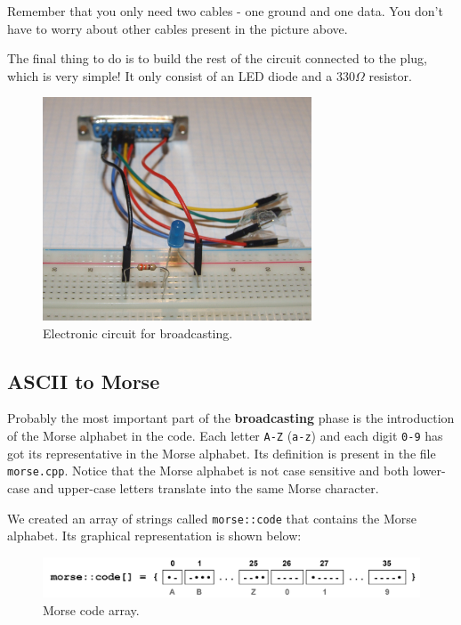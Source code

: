 \documentclass[12pt]{report}
\begin{document}
Remember that you only need two cables - one ground and one data. You don't have to worry about other cables present in the picture above.

The final thing to do is to build the rest of the circuit connected to the plug, which is very simple! It only consist of an LED diode and a 330$\Omega$ resistor.

\begin{figure}[H]
\centering\includegraphics[width=8cm]{broadcast_circuit}
\caption{Electronic circuit for broadcasting.}				
\label{fig:broadcast_circuit}
\end{figure}




\subsection{ASCII to Morse} \label{sec:asciitomorse}

Probably the most important part of the \textbf{broadcasting} phase is the introduction of the Morse alphabet in the code. Each letter \verb|A-Z| (\verb|a-z|) and each digit \verb|0-9| has got its representative in the Morse alphabet. Its definition is present in the file \verb|morse.cpp|. Notice that the Morse alphabet is not case sensitive and both lower-case and upper-case letters translate into the same Morse character.

We created an array of strings called \verb|morse::code| that contains the Morse alphabet. Its graphical representation is shown below:

\begin{figure}[H]
\centering\includegraphics[scale=0.1]{morse--code}
\caption{Morse code array.}				
\label{fig:morse_code_array}
\end{figure}
\end{document}

